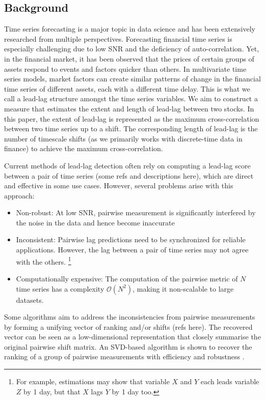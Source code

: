 \documentclass[sigconf]{acmart}
\begin{document}
\subsection{Background}
Time series forecasting is a major topic in data science and has been extensively researched from multiple perspectives. Forecasting financial time series is especially challenging due to low SNR and the deficiency of auto-correlation. Yet, in the financial market, it has been observed that the prices of certain groups of assets respond to events and factors quicker than others. In multivariate time series models, market factors can create similar patterns of change in the financial time series of different assets, each with a different time delay. This is what we call a lead-lag structure amongst the time series variables. We aim to construct a measure that estimates the extent and length of lead-lag between two stocks. In this paper, the extent of lead-lag is represented as the maximum cross-correlation between two time series up to a shift. The corresponding length of lead-lag is the number of timescale shifts (as we primarily works with discrete-time data in finance) to achieve the maximum cross-correlation. 

Current methods of lead-lag detection often rely on computing a lead-lag score between a pair of time series (some refs and descriptions here), which are direct and effective in some use cases. However, several problems arise with this approach:
\begin{itemize}
\item Non-robust: At low SNR, pairwise measurement is significantly interfered by the noise in the data and hence become inaccurate
\item Inconsistent: Pairwise lag predictions need to be synchronized for reliable applications. However, the lag between a pair of time series may not agree with the others. \footnote{For example, estimations may show that variable $X$ and $Y$ each leads variable $Z$ by 1 day, but that $X$ lags $Y$ by 1 day too.}
\item Computationally expensive: The computation of the pairwise metric of $N$ time series has a complexity $\mathcal{O}(N^2)$, making it non-scalable to large datasets.
\end{itemize}

Some algorithms aim to address the inconsistencies from pairwise measurements by forming a unifying vector of ranking and/or shifts (refs here). The recovered vector can be seen as a low-dimensional representation that closely summarise the original pairwise shift matrix. An SVD-based algorithm is shown to recover the ranking of a group of pairwise measurements with efficiency and robustness \cite{synchronization_SVD}.
\end{document}
